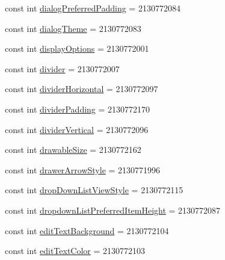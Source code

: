 \begin{DoxyCompactItemize}
\item 
const int \mbox{\hyperlink{class_f_w_p_s___app_1_1_droid_1_1_resource_1_1_attribute_a624eb9d28fe8fb46ab0d38f115fe34af}{dialog\+Preferred\+Padding}} = 2130772084
\item 
const int \mbox{\hyperlink{class_f_w_p_s___app_1_1_droid_1_1_resource_1_1_attribute_a60a97a1b19c288ad6c2602239d01689d}{dialog\+Theme}} = 2130772083
\item 
const int \mbox{\hyperlink{class_f_w_p_s___app_1_1_droid_1_1_resource_1_1_attribute_a07d6c5f89db684794c53cb4606f1a157}{display\+Options}} = 2130772001
\item 
const int \mbox{\hyperlink{class_f_w_p_s___app_1_1_droid_1_1_resource_1_1_attribute_a5810a38890b957b24deafd0414670772}{divider}} = 2130772007
\item 
const int \mbox{\hyperlink{class_f_w_p_s___app_1_1_droid_1_1_resource_1_1_attribute_aac71e10c4a3ec0921d33761effbf92b5}{divider\+Horizontal}} = 2130772097
\item 
const int \mbox{\hyperlink{class_f_w_p_s___app_1_1_droid_1_1_resource_1_1_attribute_ada99f8fbe44b67a7e0d96cb9c170ea77}{divider\+Padding}} = 2130772170
\item 
const int \mbox{\hyperlink{class_f_w_p_s___app_1_1_droid_1_1_resource_1_1_attribute_a120d528db19c24a87e6c0bfc79ed11ed}{divider\+Vertical}} = 2130772096
\item 
const int \mbox{\hyperlink{class_f_w_p_s___app_1_1_droid_1_1_resource_1_1_attribute_a94f45c7111b6b4a5a2bec4ba07b64415}{drawable\+Size}} = 2130772162
\item 
const int \mbox{\hyperlink{class_f_w_p_s___app_1_1_droid_1_1_resource_1_1_attribute_adff7d34d2ff747c42b2dc2fb3c49d9df}{drawer\+Arrow\+Style}} = 2130771996
\item 
const int \mbox{\hyperlink{class_f_w_p_s___app_1_1_droid_1_1_resource_1_1_attribute_a8e98f79a386bf7ee84e36f008e905988}{drop\+Down\+List\+View\+Style}} = 2130772115
\item 
const int \mbox{\hyperlink{class_f_w_p_s___app_1_1_droid_1_1_resource_1_1_attribute_a3fa175ffe8060fdce19f544c50148f40}{dropdown\+List\+Preferred\+Item\+Height}} = 2130772087
\item 
const int \mbox{\hyperlink{class_f_w_p_s___app_1_1_droid_1_1_resource_1_1_attribute_add311821b112b2ac6db613c5403e2add}{edit\+Text\+Background}} = 2130772104
\item 
const int \mbox{\hyperlink{class_f_w_p_s___app_1_1_droid_1_1_resource_1_1_attribute_ac29e7c915dcd2609a8e09005b4e88903}{edit\+Text\+Color}} = 2130772103

\end{DoxyCompactItemize}
